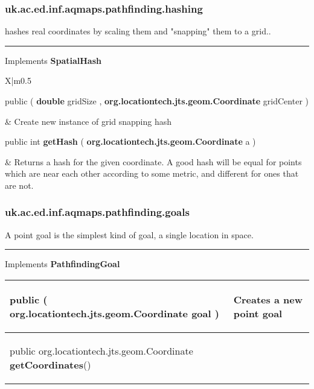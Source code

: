 \subsubsection*{ uk.ac.ed.inf.aqmaps.pathfinding.hashing }
 {\scriptsize hashes real coordinates by scaling them and "snapping" them to a grid..
 
\vspace*{4pt} \hrule \vspace*{3pt}
Implements \textbf{ SpatialHash }
\vspace*{-5pt} 
\begin{tabularx}{\linewidth}{X|m{0.5\textwidth}}
\label{tab:GridSnappingSpatialHash}
\begin{raggedleft}public  \textbf{\hyperref[tab:GridSnappingSpatialHash]{\color{blue}{GridSnappingSpatialHash}} }(\newline \hfill 
\hspace*{ 5pt} \textbf{double} gridSize , \newline
 \hspace*{ 5pt} \textbf{org.locationtech.jts.geom.Coordinate} gridCenter  )
\end{raggedleft} &
 Create new instance of grid snapping hash\\ \hline 
\begin{raggedleft}public int \textbf{getHash }(\hspace*{ 5pt} \textbf{org.locationtech.jts.geom.Coordinate} a  )
\end{raggedleft} &
 Returns a hash for the given coordinate. A good hash will be equal for points which are near each other\newline%
 according to some metric, and different for ones that are not.\\\end{tabularx}
}
\subsubsection*{ uk.ac.ed.inf.aqmaps.pathfinding.goals }
 {\scriptsize A point goal is the simplest kind of goal, a single location in space.
 
\vspace*{4pt} \hrule \vspace*{3pt}
Implements \textbf{ PathfindingGoal }
\vspace*{-5pt} 
\begin{tabularx}{\linewidth}{X|m{}}
\label{tab:PointGoal}
\begin{raggedleft}public  \textbf{\hyperref[tab:PointGoal]{\color{blue}{PointGoal}} }(\hspace*{ 5pt} \textbf{org.locationtech.jts.geom.Coordinate} goal  )
\end{raggedleft} &
 Creates a new point goal\\ \hline 
\begin{raggedleft}public org.locationtech.jts.geom.Coordinate \textbf{getCoordinates}()
\end{raggedleft} &
 \\\end{tabularx}
}

